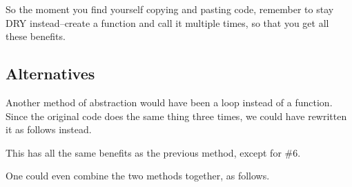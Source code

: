 \documentclass[letterpaper,10pt,english]{sphinxmanual}
\begin{document}
So the moment you find yourself copying and pasting code, remember to stay DRY instead–create a function and call it multiple times, so that you get all these benefits.


\subsection{Alternatives}
\label{\detokenize{chapter-7-abstraction:alternatives}}
Another method of abstraction would have been a loop instead of a function.  Since the original code does the same thing three times, we could have rewritten it as follows instead.

\begin{sphinxVerbatim}[commandchars=\\\{\}]
   \PYG{p}{[}    \PYG{p}{]}
        
      \PYG{p}{[}\PYG{p}{]}  \PYG{p}{[}\PYG{p}{]}
\end{sphinxVerbatim}

This has all the same benefits as the previous method, except for \#6.

One could even combine the two methods together, as follows.

\begin{sphinxVerbatim}[commandchars=\\\{\}]
    
        
      \PYG{p}{[}\PYG{p}{]}  \PYG{p}{[}\PYG{p}{]}

   \PYG{p}{[}    \PYG{p}{]}
      
\end{sphinxVerbatim}
\end{document}
